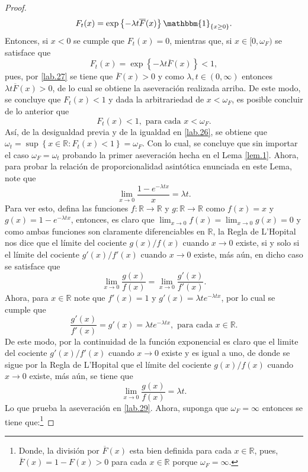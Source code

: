 \documentclass[10.5pt,notitlepage]{article}
\newcommand{\RR}{\mathbb{R}}
\newcommand{\kis}[1]{\left\{ #1 \right\}}
\theoremstyle{plain}
\begin{document}
\begin{proof}
\[
F_{t}(x) = \exp\kis{- \lambda t\overline{F}(x)}\mathbbm{1}_{\kis{x \geq 0}}. 
\]
Entonces, si \(x < 0\) se cumple que \(F_{t}(x) = 0\), mientras que, si \(x\in[0,\omega_{F})\) se satisface que
\[
F_{t}(x) = \exp\kis{- \lambda t\overline{F}(x)} < 1,
\]
pues, por \eqref{lab.27} se tiene que \(\overline{F}(x) > 0\) y como \(\lambda,t \in (0, \infty)\) entonces \(\lambda t \overline{F}(x)> 0\), de lo cual se obtiene la aseveración realizada arriba. De este modo, se concluye que \(F_{t}(x) < 1\) y dada la arbitrariedad de \(x< \omega_F\), es posible concluir de lo anterior que 
\[
F_{t}(x) < 1, \text{ para cada } x < \omega_{F}.
\]
Así, de la desigualdad previa y de la igualdad en \eqref{lab.26}, se obtiene que \(\omega_t = \sup\kis{x \in \RR : F_{t}(x) < 1}=\omega_{F}\). Con lo cual, se concluye que sin importar el caso \(\omega_{F} = \omega_{t}\) probando la primer aseveración hecha en el Lema \ref{lem.1}. Ahora, para probar la relación de proporcionalidad asintótica enunciada en este Lema, note que 
\begin{equation}\label{lab.29}
 \lim_{x \to 0}\frac{1 - e^{-\lambda t x}}{x} = \lambda t.   
\end{equation}
Para ver esto, defina las funciones \(f: \RR \to \RR\) y \(g: \RR \to \RR\) como \(f(x) = x\) y \(g(x) = 1 - e^{-\lambda t x}\), entonces, es claro que \(\lim_{x \to 0}f(x) = \lim_{x \to 0}g(x) = 0\) y como ambas funciones son claramente diferenciables en \(\RR\), la Regla de L'Hopital nos dice que el límite del cociente \(g(x)/f(x)\) cuando \(x \to 0\) existe, si y solo si el límite del cociente \(g'(x)/f'(x)\) cuando \(x\to 0\) existe, más aún, en dicho caso se satisface que 
\[
\lim_{x \to 0}\frac{g(x)}{f(x)} = \lim_{x\to 0}\frac{g'(x)}{f'(x)}.
\]
Ahora, para \(x\in \RR\) note que \(f'(x) = 1\) y \(g'(x) = \lambda t e^{-\lambda t x}\), por lo cual se cumple que 
\[
\frac{g'(x)}{f'(x)} = g'(x) = \lambda t e^{- \lambda t x}, \text{ para cada } x \in \RR.
\]
De este modo, por la continuidad de la función exponencial es claro que el limite del cociente \(g'(x)/f'(x)\) cuando \(x\to 0\) existe y es igual a uno, de donde se sigue por la Regla de L'Hopital que el límite del cociente \(g(x)/f(x)\) cuando \(x \to 0\) existe, más aún, se tiene que 
\[
\lim_{x \to 0}\frac{g(x)}{f(x)} =  \lambda t. 
\]
Lo que prueba la aseveración en \eqref{lab.29}. Ahora, suponga que \(\omega_F = \infty\) entonces se tiene que:\footnote{Donde, la división por \(\overline{F}(x)\) esta bien definida para cada \(x\in \RR\), pues, \(\overline{F}(x) = 1 - F(x)> 0\) para cada \(x\in \RR\) porque \(\omega_F = \infty\).} 

\end{proof}
\end{document}
